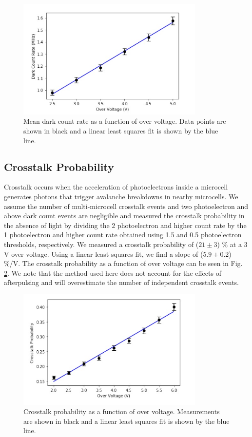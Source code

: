 \documentclass{article}
\begin{document}
\begin{figure}[ht]
    \centering     
    \includegraphics[height=6cm]{images/figura4.jpg}
    
    \caption{Mean dark count rate as a function of over voltage. Data points are shown in black and a linear least squares
    fit is shown by the blue line.}
    \label{fig:BiasVoltage2}
    
\end{figure}

\subsection{Crosstalk Probability}
Crosstalk occurs when the acceleration of photoelectrons inside a microcell generates photons that trigger avalanche breakdowns in nearby microcells. We assume the number of multi-microcell crosstalk events and two photoelectron and above dark count events are negligible and measured the crosstalk probability in the absence of light by dividing the 2 photoelectron and higher count rate by the 1 photoelectron and higher count rate obtained using 1.5 and 0.5 photoelectron thresholds, respectively. We measured a crosstalk probability of ($21 \pm 3$) \% at a 3 V over voltage. Using a linear least squares fit, we find a slope of ($5.9 \pm 0.2$) \%/V. The crosstalk probability as a function of over voltage can be seen in Fig. \ref{fig:OverVoltage}. We note that the method used here does not account for the effects of afterpulsing and will overestimate the number of independent crosstalk events.

\begin{figure}[ht]
    \centering     
    \includegraphics[height=6cm]{images/figura5.jpg}
    
    \caption{Crosstalk probability as a function of over voltage. Measurements are shown in black and a linear least squares fit is shown by the blue line.}
    \label{fig:OverVoltage}
    
\end{figure}
\end{document}
